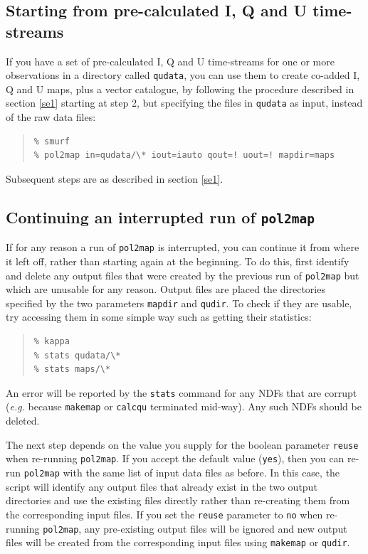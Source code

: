 \documentclass[twoside,11pt]{starlink}
\begin{document}
\subsection{Starting from pre-calculated I, Q and U time-streams}
If you have a set of pre-calculated I, Q and U time-streams for one or
more observations in a directory called \texttt{qudata}, you can use them
to create co-added  I, Q and U maps, plus a vector catalogue, by
following the procedure described in section \ref{se1} starting at step
2, but specifying the files in \texttt{qudata} as input, instead of the
raw data files:
\begin{quote}
\begin{verbatim}
% smurf
% pol2map in=qudata/\* iout=iauto qout=! uout=! mapdir=maps
\end{verbatim}
\end{quote}
Subsequent steps are as described in section \ref{se1}.


\subsection{Continuing an interrupted run of \texttt{pol2map}}
If for any reason a run of \texttt{pol2map} is interrupted, you can
continue it from where it left off, rather than starting again at the
beginning. To do this, first identify and delete any output files that were
created by the previous run of \texttt{pol2map} but which are unusable
for any reason. Output files are placed the directories specified by the
two parameters \texttt{mapdir} and \texttt{qudir}. To check if they are
usable, try accessing them in some simple way such as getting their
statistics:
\begin{quote}
\begin{verbatim}
% kappa
% stats qudata/\*
% stats maps/\*
\end{verbatim}
\end{quote}

An error will be reported by the \texttt{stats} command for any NDFs
that are corrupt (\emph{e.g.} because \texttt{makemap} or \texttt{calcqu}
terminated mid-way). Any such NDFs should be deleted.

The next step depends on the value you supply for the boolean parameter
\texttt{reuse} when re-running \texttt{pol2map}. If you accept the
default value (\texttt{yes}), then you can re-run \texttt{pol2map} with the
same list of input data files as before. In this case, the script will
identify any output files that already exist in the two output directories
and use the existing files directly rather than re-creating them from the
corresponding input files. If you set the \texttt{reuse} parameter to
\texttt{no} when re-running \texttt{pol2map}, any pre-existing output files
will be ignored and new output files will be created from the
corresponding input files using \texttt{makemap} or \texttt{qudir}.
\end{document}

